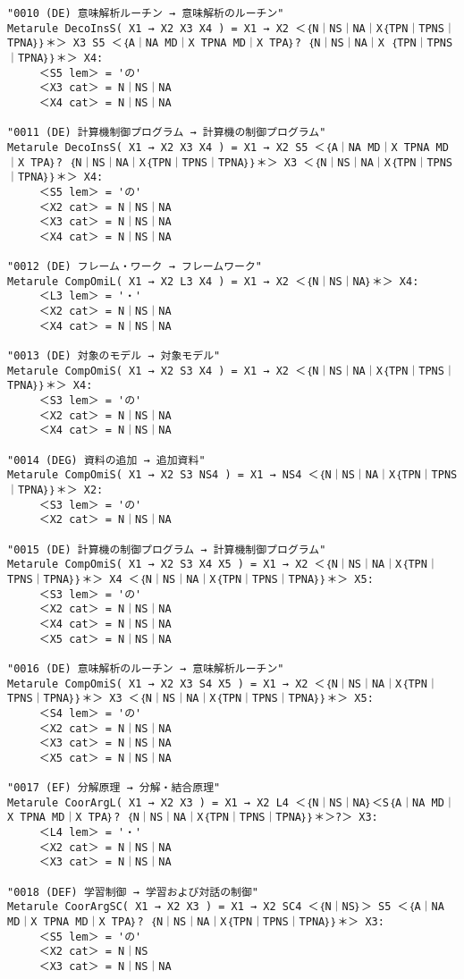 {\begin{verbatim}
"0010 (DE) 意味解析ルーチン → 意味解析のルーチン"
Metarule DecoInsS( X1 → X2 X3 X4 ) = X1 → X2 ＜｛N｜NS｜NA｜X｛TPN｜TPNS｜TPNA｝｝＊＞ X3 S5 ＜｛A｜NA MD｜X TPNA MD｜X TPA｝? ｛N｜NS｜NA｜X ｛TPN｜TPNS｜TPNA｝｝＊＞ X4:
     ＜S5 lem＞ = 'の'
     ＜X3 cat＞ = N｜NS｜NA
     ＜X4 cat＞ = N｜NS｜NA

"0011 (DE) 計算機制御プログラム → 計算機の制御プログラム"
Metarule DecoInsS( X1 → X2 X3 X4 ) = X1 → X2 S5 ＜｛A｜NA MD｜X TPNA MD｜X TPA｝? ｛N｜NS｜NA｜X｛TPN｜TPNS｜TPNA｝｝＊＞ X3 ＜｛N｜NS｜NA｜X｛TPN｜TPNS｜TPNA｝｝＊＞ X4:
     ＜S5 lem＞ = 'の'
     ＜X2 cat＞ = N｜NS｜NA
     ＜X3 cat＞ = N｜NS｜NA
     ＜X4 cat＞ = N｜NS｜NA

"0012 (DE) フレーム・ワーク → フレームワーク"
Metarule CompOmiL( X1 → X2 L3 X4 ) = X1 → X2 ＜｛N｜NS｜NA｝＊＞ X4:
     ＜L3 lem＞ = '・'
     ＜X2 cat＞ = N｜NS｜NA
     ＜X4 cat＞ = N｜NS｜NA

"0013 (DE) 対象のモデル → 対象モデル"
Metarule CompOmiS( X1 → X2 S3 X4 ) = X1 → X2 ＜｛N｜NS｜NA｜X｛TPN｜TPNS｜TPNA｝｝＊＞ X4:
     ＜S3 lem＞ = 'の'
     ＜X2 cat＞ = N｜NS｜NA
     ＜X4 cat＞ = N｜NS｜NA

"0014 (DEG) 資料の追加 → 追加資料"
Metarule CompOmiS( X1 → X2 S3 NS4 ) = X1 → NS4 ＜｛N｜NS｜NA｜X｛TPN｜TPNS｜TPNA｝｝＊＞ X2:
     ＜S3 lem＞ = 'の'
     ＜X2 cat＞ = N｜NS｜NA

"0015 (DE) 計算機の制御プログラム → 計算機制御プログラム"
Metarule CompOmiS( X1 → X2 S3 X4 X5 ) = X1 → X2 ＜｛N｜NS｜NA｜X｛TPN｜TPNS｜TPNA｝｝＊＞ X4 ＜｛N｜NS｜NA｜X｛TPN｜TPNS｜TPNA｝｝＊＞ X5:
     ＜S3 lem＞ = 'の'
     ＜X2 cat＞ = N｜NS｜NA
     ＜X4 cat＞ = N｜NS｜NA
     ＜X5 cat＞ = N｜NS｜NA

"0016 (DE) 意味解析のルーチン → 意味解析ルーチン"
Metarule CompOmiS( X1 → X2 X3 S4 X5 ) = X1 → X2 ＜｛N｜NS｜NA｜X｛TPN｜TPNS｜TPNA｝｝＊＞ X3 ＜｛N｜NS｜NA｜X｛TPN｜TPNS｜TPNA｝｝＊＞ X5:
     ＜S4 lem＞ = 'の'
     ＜X2 cat＞ = N｜NS｜NA
     ＜X3 cat＞ = N｜NS｜NA
     ＜X5 cat＞ = N｜NS｜NA

"0017 (EF) 分解原理 → 分解・結合原理"
Metarule CoorArgL( X1 → X2 X3 ) = X1 → X2 L4 ＜｛N｜NS｜NA｝＜S｛A｜NA MD｜X TPNA MD｜X TPA｝? ｛N｜NS｜NA｜X｛TPN｜TPNS｜TPNA｝｝＊＞?＞ X3:
     ＜L4 lem＞ = '・'
     ＜X2 cat＞ = N｜NS｜NA
     ＜X3 cat＞ = N｜NS｜NA

"0018 (DEF) 学習制御 → 学習および対話の制御"
Metarule CoorArgSC( X1 → X2 X3 ) = X1 → X2 SC4 ＜｛N｜NS｝＞ S5 ＜｛A｜NA MD｜X TPNA MD｜X TPA｝? ｛N｜NS｜NA｜X｛TPN｜TPNS｜TPNA｝｝＊＞ X3:
     ＜S5 lem＞ = 'の'
     ＜X2 cat＞ = N｜NS
     ＜X3 cat＞ = N｜NS｜NA


\end{verbatim}}

